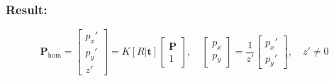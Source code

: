 \documentclass[12pt]{article}
\begin{document}
\subsubsection*{Result:}
\begin{equation}
    \mathbf{P}_{\text{hom}} = \begin{bmatrix} p_x' \\ p_y' \\ z' \end{bmatrix} = K [R | \mathbf{t}] \begin{bmatrix} \mathbf{P} \\ 1 \end{bmatrix}, \quad \begin{bmatrix} p_x \\ p_y \end{bmatrix} = \frac{1}{z'} \begin{bmatrix} p_x' \\ p_y' \end{bmatrix}, \quad z' \neq 0 \label{eq:forward}
\end{equation}

\newpage
\end{document}
